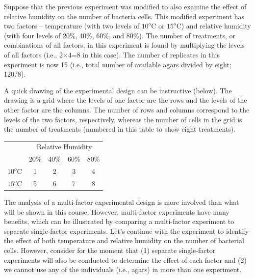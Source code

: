 \documentclass[10pt,openany]{book}\usepackage[]{graphicx}\usepackage[]{color}
\begin{document}
Suppose that the previous experiment was modified to also examine the effect of relative humidity on the number of bacteria cells.  This modified experiment has two factors -- temperature (with two levels of $10^{o}$C or $15^{o}$C) and relative humidity (with four levels of 20\%, 40\%, 60\%, and 80\%).  The number of treatments, or combinations of all factors, in this experiment is found by multiplying the levels of all factors (i.e., 2$\times$4=8 in this case).  The number of replicates in this experiment is now 15 (i.e., total number of available agars divided by eight; 120/8).

A quick drawing of the experimental design can be instructive (below).  The drawing is a grid where the levels of one factor are the rows and the levels of the other factor are the columns.  The number of rows and columns correspond to the levels of the two factors, respectively, whereas the number of cells in the grid is the number of treatments (numbered in this table to show eight treatments).

\begin{center}
\begin{tabular}{cc|c|c|c}
 & \multicolumn{4}{c}{Relative Humidity} \\
\cline{2-5}
 & 20\% & 40\% & 60\% & 80\% \\
\cline{2-5}
\multicolumn{1}{c|}{$10^{o}$C} & 1 & 2 & 3 & \multicolumn{1}{c|}{4} \\
\hline
\multicolumn{1}{c|}{$15^{o}$C} & 5 & 6 & 7 & \multicolumn{1}{c|}{8} \\
\cline{2-5}
\end{tabular}
\end{center}


\vspace{-12pt}

\vspace{-12pt}

The analysis of a multi-factor experimental design is more involved than what will be shown in this course.  However, multi-factor experiments have many benefits, which can be illustrated by comparing a multi-factor experiment to separate single-factor experiments.  Let's continue with the experiment to identify the effect of both temperature and relative humidity on the number of bacterial cells.  However, consider for the moment that (1) separate single-factor experiments will also be conducted to determine the effect of each factor and (2) we cannot use any of the individuals (i.e., agars) in more than one experiment.
\end{document}
